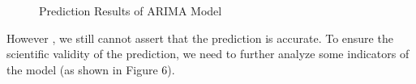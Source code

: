 \documentclass[12pt]{article}
\begin{document}
\vspace{-0.2cm} 
\begin{figure}[htbp]
   \centering
    \caption{Prediction Results of ARIMA Model}
\end{figure}

However , we still cannot assert that the prediction is accurate. To ensure the scientific validity of the prediction, we need to further analyze some indicators of the model (as shown in Figure 6).
\end{document}
